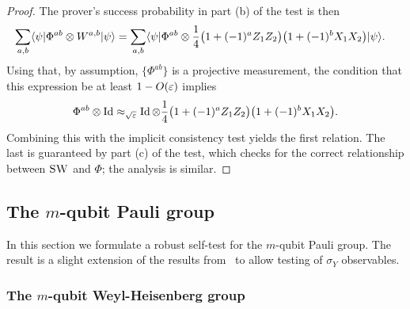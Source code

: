 \begin{proof}
The prover's success probability in part (b) of the test is then
\begin{align*}
\sum_{a,b} \langle\psi| \Phi^{ab} \otimes W^{a,b} |\psi\rangle &= \sum_{a,b} \langle\psi| \Phi^{ab} \otimes \frac{1}{4} \big(1+(-1)^a Z_1Z_2\big)\big(1+(-1)^bX_1X_2\big) |\psi\rangle.
\end{align*}
Using that, by assumption, $\{\Phi^{ab}\}$ is a projective measurement, the condition that this expression be at least $1-O(\varepsilon)$ implies 
$$\Phi^{ab} \otimes \mathop{\rm Id}\nolimits \approx_{\sqrt{\varepsilon}}\mathop{\rm Id}\nolimits \otimes \frac{1}{4}\big(1+(-1)^a Z_1Z_2\big)\big(1+(-1)^bX_1X_2\big).$$ 
Combining this with the implicit consistency test yields the first relation. The last is guaranteed by part (c) of the test, which checks for the correct relationship between $\textsc{SW}$ and $\Phi$; the analysis is similar.  
\end{proof}


\subsection{The \texorpdfstring{$m$}{m}-qubit Pauli group}
\label{sec:pauli-group}

In this section we formulate a robust self-test for the $m$-qubit Pauli group. The result is a slight extension of the results from~\cite{natarajan2016robust} to allow testing of $\sigma_Y$ observables. 

\subsubsection{The \texorpdfstring{$m$}{m}-qubit Weyl-Heisenberg group}
\label{sec:pbt}

